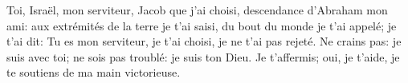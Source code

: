 Toi, Israël, mon serviteur, Jacob que j’ai choisi,
	descendance d’Abraham mon ami:
	aux extrémités de la terre je t’ai saisi,
	du bout du monde je t’ai appelé;
	je t’ai dit: Tu es mon serviteur,
	je t’ai choisi, je ne t’ai pas rejeté.
Ne crains pas: je suis avec toi;
	ne sois pas troublé: je suis ton Dieu.
Je t’affermis; oui, je t’aide,
	je te soutiens de ma main victorieuse.
